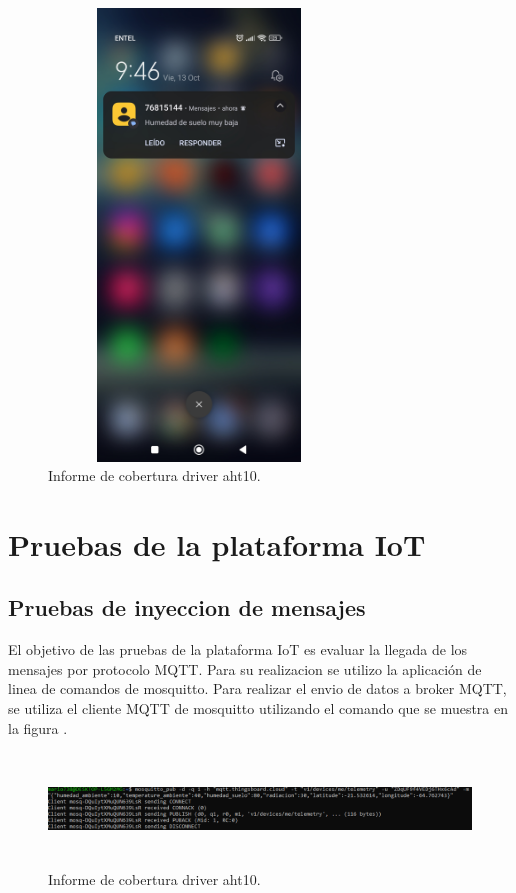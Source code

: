 \begin{figure}[h!]
  \centering
    \includegraphics[width=8cm, height=12cm]{./Figures/sms_alarma.jpg}
  \caption{Informe de cobertura driver aht10.}
    \label{fig:sms alarma}
\end{figure}
\clearpage 
\section{Pruebas de la plataforma IoT}
\subsection{Pruebas de inyeccion de mensajes}
El objetivo de las pruebas de la plataforma IoT es evaluar la llegada de los mensajes por protocolo MQTT.
Para su realizacion se utilizo la aplicación de linea de comandos de mosquitto.
Para realizar el envio de datos a broker MQTT, se utiliza el cliente MQTT de mosquitto utilizando el comando que se muestra en la figura .

\begin{figure}[h!]
  \centering
    \includegraphics[width=\linewidth, height=3cm]{./Figures/mosquito_enviodatos.png}
  \caption{Informe de cobertura driver aht10.}
    \label{fig:mosquitto pub}
\end{figure}

